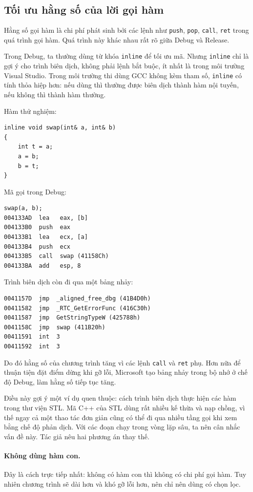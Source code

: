 \documentclass[11pt]{article}
\begin{document}
\subsection{Tối ưu hằng số của lời gọi hàm}

Hằng số gọi hàm là chi phí phát sinh bởi các lệnh như \texttt{push},
\texttt{pop}, \texttt{call}, \texttt{ret} trong quá trình gọi hàm. Quá trình
này khác nhau rất rõ giữa Debug và Release.

Trong Debug, ta thường dùng từ khóa \texttt{inline} để tối ưu mã. Nhưng
\texttt{inline} chỉ là gợi ý cho trình biên dịch, không phải lệnh bắt buộc,
ít nhất là trong môi trường Visual Studio. Trong môi trường thi dùng GCC không
kèm tham số, \texttt{inline} có tính thỏa hiệp hơn: nếu dùng thì thường được
biên dịch thành hàm nội tuyến, nếu không thì thành hàm thường.

Hàm thử nghiệm:
\begin{verbatim}
inline void swap(int& a, int& b)
{
    int t = a;
    a = b;
    b = t;
}
\end{verbatim}

Mã gọi trong Debug:
\begin{verbatim}
swap(a, b);
004133AD  lea   eax, [b]
004133B0  push  eax
004133B1  lea   ecx, [a]
004133B4  push  ecx
004133B5  call  swap (41158Ch)
004133BA  add   esp, 8
\end{verbatim}

Trình biên dịch còn đi qua một bảng nhảy:
\begin{verbatim}
0041157D  jmp  _aligned_free_dbg (41B4D0h)
00411582  jmp  _RTC_GetErrorFunc (416C30h)
00411587  jmp  GetStringTypeW (425788h)
0041158C  jmp  swap (411B20h)
00411591  int  3
00411592  int  3
\end{verbatim}

Do đó hằng số của chương trình tăng vì các lệnh \texttt{call} và
\texttt{ret} phụ. Hơn nữa để thuận tiện đặt điểm dừng khi gỡ lỗi, Microsoft
tạo bảng nhảy trong bộ nhớ ở chế độ Debug, làm hằng số tiếp tục tăng.

Điều này gợi ý một ví dụ quen thuộc: cách trình biên dịch thực hiện các hàm
trong thư viện STL. Mã C++ của STL dùng rất nhiều kế thừa và nạp chồng, vì thế
ngay cả một thao tác đơn giản cũng có thể đi qua nhiều tầng gọi khi xem bằng
chế độ phản dịch. Với các đoạn chạy trong vòng lặp sâu, ta nên cân nhắc vấn đề
này. Tác giả nêu hai phương án thay thế.

\paragraph{Không dùng hàm con.}
Đây là cách trực tiếp nhất: không có hàm con thì không có chi phí gọi hàm. Tuy
nhiên chương trình sẽ dài hơn và khó gỡ lỗi hơn, nên chỉ nên dùng có chọn lọc.
\end{document}
